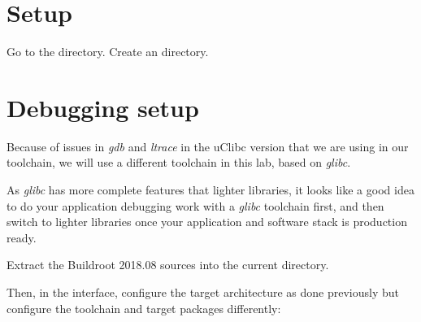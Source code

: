 
\section{Setup}

Go to the  directory.
Create an  directory.

\section{Debugging setup}

Because of issues in {\em gdb} and {\em ltrace} in the uClibc version
that we are using in our toolchain, we will use a different toolchain
in this lab, based on {\em glibc}. 

As {\em glibc} has more complete features that lighter libraries,
it looks like a good idea to do your application debugging work
with a {\em glibc} toolchain first, and then switch to lighter libraries
once your application and software stack is production ready. 

Extract the Buildroot 2018.08 sources into the current directory.

Then, in the  interface, configure the target
architecture as done previously but configure the toolchain and
target packages differently:

